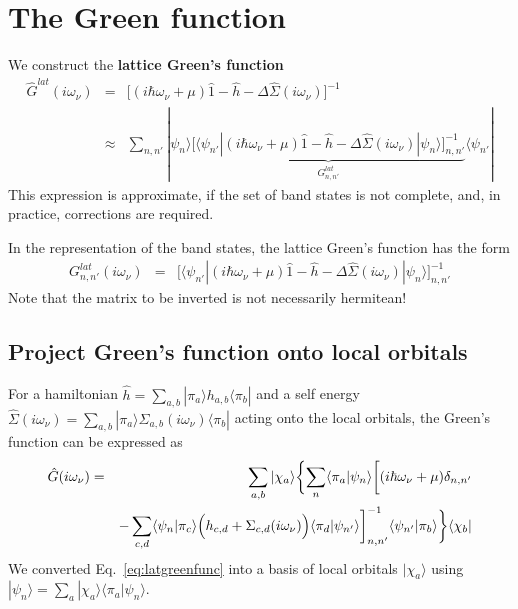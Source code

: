 \documentclass[11pt,a4paper]{report}
\begin{document}
\chapter{The Green function}
We construct the \textbf{lattice Green's function}
\begin{eqnarray}
\hat{G}^{lat}(i\omega_\nu)&=&
\biggl[(i\hbar\omega_\nu+\mu)\hat{1}
-\hat{h}-\Delta\hat{\Sigma}(i\omega_\nu)\biggr]^{-1}
\nonumber\\
&\approx&\sum_{n,n'}|\psi_n\rangle
\underbrace{
\biggl[\langle\psi_{n'}|(i\hbar\omega_\nu+\mu)\hat{1}-\hat{h}
-\Delta\hat{\Sigma}(i\omega_\nu)|\psi_n\rangle\biggr]_{n,n'}^{-1}
}_{G^{lat}_{n,n'}}
\langle\psi_{n'}|
\label{eq:latgreenfunc}
\end{eqnarray}
This expression is approximate, if the set of band states is not
complete, and, in practice, corrections are required.

In the representation of the band states, the lattice Green's function
has the form
\begin{eqnarray}
G^{lat}_{n,n'}(i\omega_\nu)&=&
\biggl[\langle\psi_{n'}|(i\hbar\omega_\nu+\mu)\hat{1}-\hat{h}
-\Delta\hat{\Sigma}(i\omega_\nu)|\psi_n\rangle\biggr]_{n,n'}^{-1}
\label{eq:latgreenfuncmat}
\end{eqnarray}
Note that the matrix to be inverted is not necessarily hermitean!

\section{Project Green's function onto local orbitals}
For a hamiltonian $\hat{h}=\sum_{a,b}|\pi_a\rangle
h_{a,b}\langle\pi_b|$ and a self energy 
$\hat{\Sigma}(i\omega_\nu)=
\sum_{a,b}|\pi_a\rangle
\Sigma_{a,b}(i\omega_\nu)
\langle\pi_b|$
acting onto the local orbitals, the Green's function can be expressed
as
\begin{eqnarray}
\hat{G}(i\omega_\nu)&=&
\sum_{a,b}|\chi_a\rangle
\biggl\lbrace
\sum_n\langle\pi_a|\psi_n\rangle
\biggl[
(i\hbar\omega_\nu+\mu)\delta_{n,n'}
\nonumber\\
&&-\sum_{c,d}\langle\psi_n|\pi_c\rangle
\Bigl(h_{c,d}+\Sigma_{c,d}(i\omega_\nu)\Bigr)
\langle\pi_d|\psi_{n'}\rangle
\biggr]^{-1}_{n,n'}
\langle\psi_{n'}|\pi_b\rangle
\biggr\rbrace
\langle\chi_b|
\label{eq:greenlocorb}
\end{eqnarray}
We converted Eq.~\eqref{eq:latgreenfunc} into a basis of local
orbitals $|\chi_a\rangle$ using
$|\psi_n\rangle=\sum_a|\chi_a\rangle\langle\pi_a|\psi_n\rangle$.
\end{document}
